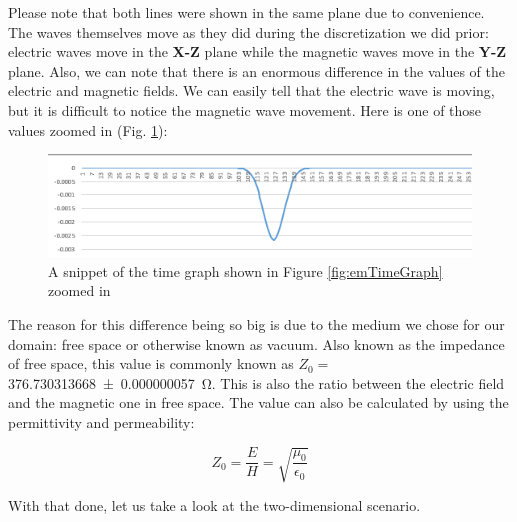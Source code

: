 Please note that both lines were shown in the same plane due to convenience. The waves themselves move as they did during the discretization we did prior: electric waves move in the \textbf{X-Z} plane while the magnetic waves move in the \textbf{Y-Z} plane. Also, we can note that there is an enormous difference in the values of the electric and magnetic fields. We can easily tell that the electric wave is moving, but it is difficult to notice the magnetic wave movement. Here is one of those values zoomed in (Fig. \ref{fig:mTimeSnippet}):

\begin{figure}[h!]
	\centering
	\includegraphics{Figures/1DmagneticTimeSnippet}
	\decoRule
	\caption[1D Magnetic Time Snippet]{A snippet of the time graph shown in Figure \ref{fig:emTimeGraph} zoomed in}
	\label{fig:mTimeSnippet}
\end{figure}

The reason for this difference being so big is due to the medium we chose for our domain: free space or otherwise known as vacuum. Also known as the impedance of free space, this value is commonly known as $Z_0 = $ \SI{376.730313668(57)}{\ohm}. This is also the ratio between the electric field and the magnetic one in free space. The value can also be calculated by using the permittivity and permeability:

\begin{equation}
	\label{eqn:impedance}
	Z_0 = \frac{E}{H} = \sqrt{\frac{\mu_0}{\epsilon_{0}}}
\end{equation}

With that done, let us take a look at the two-dimensional scenario.
	